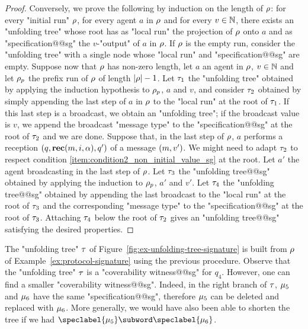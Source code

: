 \begin{proof}
Conversely, we prove the following by induction on the length of $\rho$: for every "initial run" $\rho$, for every agent $a$ in $\rho$ and for every $v \in \mathbb{N}$, there exists an "unfolding tree" whose root has as "local run" the projection of $\rho$ onto $a$ and as "specification@@sg" the $v$-"output" of $a$ in $\rho$. If $\rho$ is the empty run, consider the "unfolding tree" with a single node whose "local run" and "specification@@sg" are empty. Suppose now that $\rho$ has non-zero length, let $a$ an agent in $\rho$, $v \in \mathbb{N}$ and let $\rho_p$ the prefix run of $\rho$ of length $|\rho|-1$.
Let $\tau_1$ the "unfolding tree" obtained by applying the induction hypothesis to $\rho_p$, $a$ and $v$, and consider $\tau_2$ obtained by simply appending the last step of $a$ in $\rho$ to the "local run" at the root of $\tau_1$. If this last step is a broadcast, we obtain an "unfolding tree"; if the broadcast value is $v$, we append the broadcast "message type" to the "specification@@sg" at the root of $\tau_2$ and we are done. 
Suppose that, in the last step of $\rho$, $a$ performs a reception $(q, \textbf{rec}(m, i, \alpha),q')$ of a message $(m,v')$. We might need to adapt $\tau_2$ to respect condition \ref{item:condition2_non_initial_value_sg} at the root. Let $a'$ the agent broadcasting in the last step of $\rho$. Let $\tau_3$ the "unfolding tree@@sg" obtained by applying the induction to $\rho_p$, $a'$ and $v'$. Let $\tau_4$ the "unfolding tree@@sg" obtained by appending the last broadcast to the "local run" at the root of $\tau_3$ and the corresponding "message type" to the "specification@@sg" at the root of $\tau_3$. Attaching $\tau_4$ below the root of $\tau_2$ gives an "unfolding tree@@sg" satisfying the desired properties. 
\end{proof}


	The "unfolding tree" $\tau$ of Figure~\ref{fig:ex-unfolding-tree-signature} is built from $\rho$ of Example~\ref{ex:protocol-signature} using the previous procedure.
	 Observe that the "unfolding tree" $\tau$  is a "coverability witness@@sg" for $q_4$. However, one can find a smaller "coverability witness@@sg". 
	Indeed, in the right branch of $\tau$, $\mu_5$ and $\mu_6$ have the same "specification@@sg", therefore $\mu_5$ can be deleted and replaced with $\mu_6$. More generally, we would have also been able to shorten the tree if we had $\speclabel{\node_5} \subword \speclabel{\node_6}$. 

